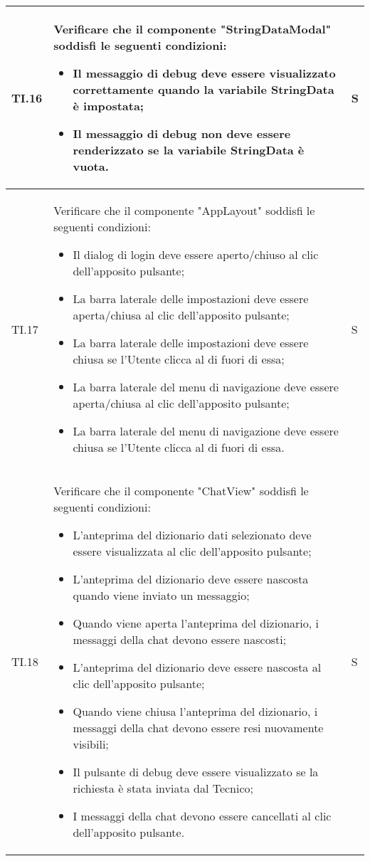 \begin{adjustwidth}{-0.5cm}{-0.5cm}
\begin{longtable}{|P{1.5cm}|>{\raggedright}P{9.5cm}|>{\arraybackslash}P{1.5cm}|}
    \hline TI.16 & Verificare che il componente "StringDataModal" soddisfi le seguenti condizioni:
    \begin{itemize}
      \item Il messaggio di debug deve essere visualizzato correttamente quando la variabile StringData è impostata;
      \item Il messaggio di debug non deve essere renderizzato se la variabile StringData è vuota.
    \end{itemize} & S \\

    \hline TI.17 & Verificare che il componente "AppLayout" soddisfi le seguenti condizioni:
    \begin{itemize}
      \item Il dialog di login deve essere aperto/chiuso al clic dell'apposito pulsante;
      \item La barra laterale delle impostazioni deve essere aperta/chiusa al clic dell'apposito pulsante;
      \item La barra laterale delle impostazioni deve essere chiusa se l'Utente clicca al di fuori di essa;
      \item La barra laterale del menu di navigazione deve essere aperta/chiusa al clic dell'apposito pulsante;
      \item La barra laterale del menu di navigazione deve essere chiusa se l'Utente clicca al di fuori di essa.
    \end{itemize} & S \\

    \hline TI.18 & Verificare che il componente "ChatView" soddisfi le seguenti condizioni:
    \begin{itemize}
      \item L'anteprima del dizionario dati selezionato deve essere visualizzata al clic dell'apposito pulsante;
      \item L'anteprima del dizionario deve essere nascosta quando viene inviato un messaggio;
      \item Quando viene aperta l'anteprima del dizionario, i messaggi della chat devono essere nascosti;
      \item L'anteprima del dizionario deve essere nascosta al clic dell'apposito pulsante;
      \item Quando viene chiusa l'anteprima del dizionario, i messaggi della chat devono essere resi nuovamente visibili;
      \item Il pulsante di debug deve essere visualizzato se la richiesta è stata inviata dal Tecnico;
      \item I messaggi della chat devono essere cancellati al clic dell'apposito pulsante.
    \end{itemize} & S \\
	\end{longtable}
\end{adjustwidth}
\egroup